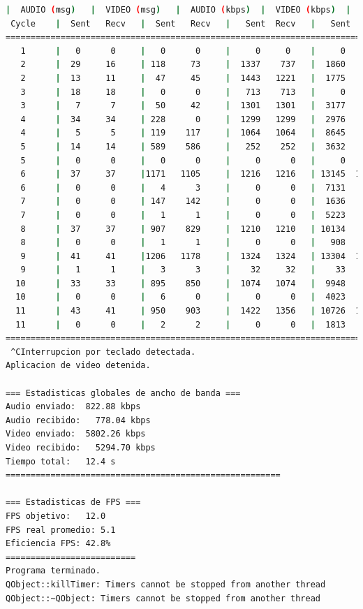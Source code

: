 \begin{lstlisting}[language=bash,basicstyle=\ttfamily\scriptsize]
          |  AUDIO (msg)   |  VIDEO (msg)   |  AUDIO (kbps)  |  VIDEO (kbps)  |   CPU (%)
 Cycle    |  Sent   Recv   |  Sent   Recv   |   Sent  Recv   |   Sent  Recv   | Program System
============================================================================================
   1      |   0      0     |   0      0     |     0     0    |     0     0    |   0      0
   2      |  29     16     | 118     73     |  1337    737   |  1860   1150   |  30     82
   2      |  13     11     |  47     45     |  1443   1221   |  1775   1707   |  30     82
   3      |  18     18     |   0      0     |   713    713   |     0      0   |  44     79
   3      |   7      7     |  50     42     |  1301   1301   |  3177   2656   |  39     80
   4      |  34     34     | 228      0     |  1299   1299   |  2976      0   |  45     85
   4      |   5      5     | 119    117     |  1064   1064   |  8645   8513   |  45     84
   5      |  14     14     | 589    586     |   252    252   |  3632   3613   |  21     22
   5      |   0      0     |   0      0     |     0      0   |     0      0   |   0     17
   6      |  37     37     |1171   1105     |  1216   1216   | 13145  12406   |  37     89
   6      |   0      0     |   4      3     |     0      0   |  7131   5348   |   0     89
   7      |   0      0     | 147    142     |     0      0   |  1636   1580   |  42      5
   7      |   0      0     |   1      1     |     0      0   |  5223   5223   |   0      5
   8      |  37     37     | 907    829     |  1210   1210   | 10134   9261   |  42     86
   8      |   0      0     |   1      1     |     0      0   |   908    908   |   0     86
   9      |  41     41     |1206   1178     |  1324   1324   | 13304  12995   |  48     90
   9      |   1      1     |   3      3     |    32     32   |    33     33   |  48     90
  10      |  33     33     | 895    850     |  1074   1074   |  9948   9450   |  40     89
  10      |   0      0     |   6      0     |     0      0   |  4023      0   | 119     88
  11      |  43     41     | 950    903     |  1422   1356   | 10726  10197   |  42     88
  11      |   0      0     |   2      2     |     0      0   |  1813   1813   |  80     88
============================================================================================
 ^CInterrupcion por teclado detectada.
Aplicacion de video detenida.

=== Estadisticas globales de ancho de banda ===
Audio enviado:	822.88 kbps
Audio recibido:   778.04 kbps
Video enviado:	5802.26 kbps
Video recibido:   5294.70 kbps
Tiempo total: 	12.4 s
=======================================================

=== Estadisticas de FPS ===
FPS objetivo: 	12.0
FPS real promedio: 5.1
Eficiencia FPS:	42.8%
==========================
Programa terminado.
QObject::killTimer: Timers cannot be stopped from another thread
QObject::~QObject: Timers cannot be stopped from another thread
\end{lstlisting}
\vspace{\baselineskip}

